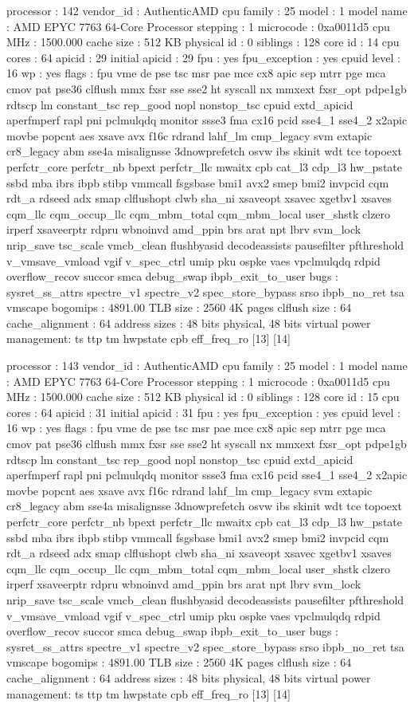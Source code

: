 processor	: 142
vendor_id	: AuthenticAMD
cpu family	: 25
model		: 1
model name	: AMD EPYC 7763 64-Core Processor
stepping	: 1
microcode	: 0xa0011d5
cpu MHz		: 1500.000
cache size	: 512 KB
physical id	: 0
siblings	: 128
core id		: 14
cpu cores	: 64
apicid		: 29
initial apicid	: 29
fpu		: yes
fpu_exception	: yes
cpuid level	: 16
wp		: yes
flags		: fpu vme de pse tsc msr pae mce cx8 apic sep mtrr pge mca cmov pat pse36 clflush mmx fxsr sse sse2 ht syscall nx mmxext fxsr_opt pdpe1gb rdtscp lm constant_tsc rep_good nopl nonstop_tsc cpuid extd_apicid aperfmperf rapl pni pclmulqdq monitor ssse3 fma cx16 pcid sse4_1 sse4_2 x2apic movbe popcnt aes xsave avx f16c rdrand lahf_lm cmp_legacy svm extapic cr8_legacy abm sse4a misalignsse 3dnowprefetch osvw ibs skinit wdt tce topoext perfctr_core perfctr_nb bpext perfctr_llc mwaitx cpb cat_l3 cdp_l3 hw_pstate ssbd mba ibrs ibpb stibp vmmcall fsgsbase bmi1 avx2 smep bmi2 invpcid cqm rdt_a rdseed adx smap clflushopt clwb sha_ni xsaveopt xsavec xgetbv1 xsaves cqm_llc cqm_occup_llc cqm_mbm_total cqm_mbm_local user_shstk clzero irperf xsaveerptr rdpru wbnoinvd amd_ppin brs arat npt lbrv svm_lock nrip_save tsc_scale vmcb_clean flushbyasid decodeassists pausefilter pfthreshold v_vmsave_vmload vgif v_spec_ctrl umip pku ospke vaes vpclmulqdq rdpid overflow_recov succor smca debug_swap ibpb_exit_to_user
bugs		: sysret_ss_attrs spectre_v1 spectre_v2 spec_store_bypass srso ibpb_no_ret tsa vmscape
bogomips	: 4891.00
TLB size	: 2560 4K pages
clflush size	: 64
cache_alignment	: 64
address sizes	: 48 bits physical, 48 bits virtual
power management: ts ttp tm hwpstate cpb eff_freq_ro [13] [14]

processor	: 143
vendor_id	: AuthenticAMD
cpu family	: 25
model		: 1
model name	: AMD EPYC 7763 64-Core Processor
stepping	: 1
microcode	: 0xa0011d5
cpu MHz		: 1500.000
cache size	: 512 KB
physical id	: 0
siblings	: 128
core id		: 15
cpu cores	: 64
apicid		: 31
initial apicid	: 31
fpu		: yes
fpu_exception	: yes
cpuid level	: 16
wp		: yes
flags		: fpu vme de pse tsc msr pae mce cx8 apic sep mtrr pge mca cmov pat pse36 clflush mmx fxsr sse sse2 ht syscall nx mmxext fxsr_opt pdpe1gb rdtscp lm constant_tsc rep_good nopl nonstop_tsc cpuid extd_apicid aperfmperf rapl pni pclmulqdq monitor ssse3 fma cx16 pcid sse4_1 sse4_2 x2apic movbe popcnt aes xsave avx f16c rdrand lahf_lm cmp_legacy svm extapic cr8_legacy abm sse4a misalignsse 3dnowprefetch osvw ibs skinit wdt tce topoext perfctr_core perfctr_nb bpext perfctr_llc mwaitx cpb cat_l3 cdp_l3 hw_pstate ssbd mba ibrs ibpb stibp vmmcall fsgsbase bmi1 avx2 smep bmi2 invpcid cqm rdt_a rdseed adx smap clflushopt clwb sha_ni xsaveopt xsavec xgetbv1 xsaves cqm_llc cqm_occup_llc cqm_mbm_total cqm_mbm_local user_shstk clzero irperf xsaveerptr rdpru wbnoinvd amd_ppin brs arat npt lbrv svm_lock nrip_save tsc_scale vmcb_clean flushbyasid decodeassists pausefilter pfthreshold v_vmsave_vmload vgif v_spec_ctrl umip pku ospke vaes vpclmulqdq rdpid overflow_recov succor smca debug_swap ibpb_exit_to_user
bugs		: sysret_ss_attrs spectre_v1 spectre_v2 spec_store_bypass srso ibpb_no_ret tsa vmscape
bogomips	: 4891.00
TLB size	: 2560 4K pages
clflush size	: 64
cache_alignment	: 64
address sizes	: 48 bits physical, 48 bits virtual
power management: ts ttp tm hwpstate cpb eff_freq_ro [13] [14]

